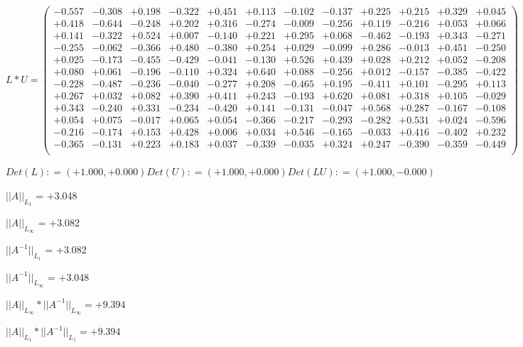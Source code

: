 \documentclass[9pt]{article}
\theoremstyle{plain}
\theoremstyle{definition}
\theoremstyle{remark}
\numberwithin{equation}{section}
\begin{document}
$L * U  = \left(
\begin{array}{
cccccccccccc}
-0.557 & -0.308 & +0.198 & -0.322 & +0.451 & +0.113 & -0.102 & -0.137 & +0.225 & +0.215 & +0.329 & +0.045 \\
+0.418 & -0.644 & -0.248 & +0.202 & +0.316 & -0.274 & -0.009 & -0.256 & +0.119 & -0.216 & +0.053 & +0.066 \\
+0.141 & -0.322 & +0.524 & +0.007 & -0.140 & +0.221 & +0.295 & +0.068 & -0.462 & -0.193 & +0.343 & -0.271 \\
-0.255 & -0.062 & -0.366 & +0.480 & -0.380 & +0.254 & +0.029 & -0.099 & +0.286 & -0.013 & +0.451 & -0.250 \\
+0.025 & -0.173 & -0.455 & -0.429 & -0.041 & -0.130 & +0.526 & +0.439 & +0.028 & +0.212 & +0.052 & -0.208 \\
+0.080 & +0.061 & -0.196 & -0.110 & +0.324 & +0.640 & +0.088 & -0.256 & +0.012 & -0.157 & -0.385 & -0.422 \\
-0.228 & -0.487 & -0.236 & -0.040 & -0.277 & +0.208 & -0.465 & +0.195 & -0.411 & +0.101 & -0.295 & +0.113 \\
+0.267 & +0.032 & +0.082 & +0.390 & +0.411 & +0.243 & -0.193 & +0.620 & +0.081 & +0.318 & +0.105 & -0.029 \\
+0.343 & -0.240 & +0.331 & -0.234 & -0.420 & +0.141 & -0.131 & -0.047 & +0.568 & +0.287 & -0.167 & -0.108 \\
+0.054 & +0.075 & -0.017 & +0.065 & +0.054 & -0.366 & -0.217 & -0.293 & -0.282 & +0.531 & +0.024 & -0.596 \\
-0.216 & -0.174 & +0.153 & +0.428 & +0.006 & +0.034 & +0.546 & -0.165 & -0.033 & +0.416 & -0.402 & +0.232 \\
-0.365 & -0.131 & +0.223 & +0.183 & +0.037 & -0.339 & -0.035 & +0.324 & +0.247 & -0.390 & -0.359 & -0.449 \\
\end{array}
\right)$ \newline 

$Det(L) :    = (+1.000,+0.000)     Det(U) :    = (+1.000,+0.000)     Det(LU) :    = (+1.000,-0.000)$

$||A||_{L_1}$  = +3.048

$||A||_{L_{\infty}}$ = +3.082

$||A^{-1}||_{L_1}$  = +3.082

$||A^{-1}||_{L_{\infty}}$ = +3.048

$||A||_{L_{\infty}} * ||A^{-1}||_{L_{\infty}} = +9.394$

$||A||_{L_1} * ||A^{-1}||_{L_1} = +9.394$
\end{document}
